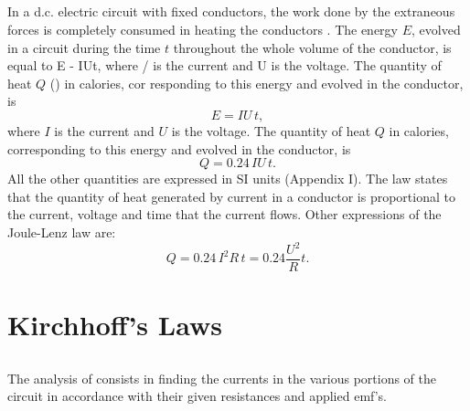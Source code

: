 \subsection{}\label{21.2.6} In a d.c. electric circuit with fixed conductors, the work done by the extraneous forces is completely consumed in heating the conductors . The energy $E$, evolved in a circuit during the time $t$ throughout the whole volume of the conductor, is equal to
E - IUt,
where / is the current and U is the voltage. The quantity of heat $Q$ () in calories, cor­ responding to this energy and evolved in the conductor, is
\begin{equation*}
E = I U\,t,
\end{equation*}
where $I$ is the current and $U$ is the voltage. The quantity of heat $Q$  in calories, corresponding to this energy and evolved in the conductor, is
\begin{equation*}
Q = 0.24 \, I U\,t.
\end{equation*}
All the other quantities are expressed in SI units (Appendix I). The  law states that the quantity of heat generated by current in a conductor is proportional to the current, voltage and time that the current flows. Other expressions of the Joule-Lenz law are:
\begin{equation*}
Q = 0.24 \, I^{2} R\,t = 0.24 \frac{U^{2}}{R}t.
\end{equation*}

\section{Kirchhoff's Laws}
\label{sec-21.3}


\subsection{}\label{21.3.1} The analysis of  consists in finding the currents in the various portions of the circuit in accordance with their given resistances and applied emf's.


